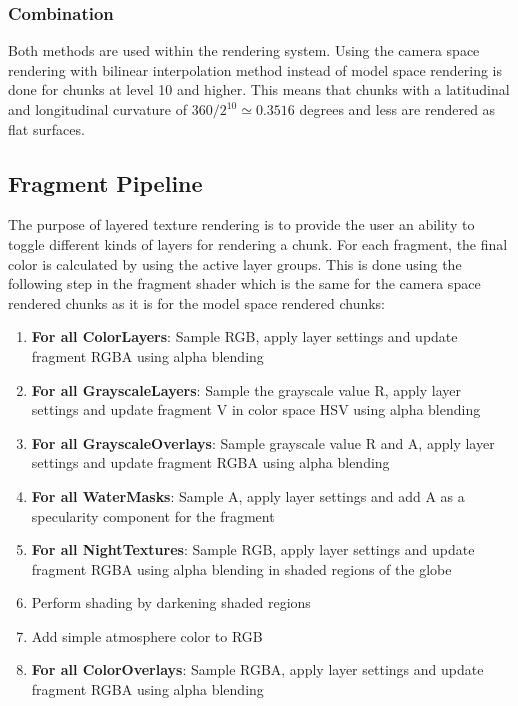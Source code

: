 \subsubsection{Combination}
Both methods are used within the rendering system. Using the camera space rendering with bilinear interpolation method instead of model space rendering is done for chunks at level 10 and higher. This means that chunks with a latitudinal and longitudinal curvature of $360 / 2^{10} \simeq 0.3516$ degrees and less are rendered as flat surfaces.


\subsection{Fragment Pipeline}

The purpose of layered texture rendering is to provide the user an ability to toggle different kinds of layers for rendering a chunk. For each fragment, the final color is calculated by using the active layer groups. This is done using the following step in the fragment shader which is the same for the camera space rendered chunks as it is for the model space rendered chunks:


\begin{enumerate}
\item \textbf{For all ColorLayers}: Sample RGB, apply layer settings and update fragment RGBA using alpha blending
\item \textbf{For all GrayscaleLayers}: Sample the grayscale value R, apply layer settings and update fragment V in color space HSV using alpha blending
\item \textbf{For all GrayscaleOverlays}: Sample grayscale value R and A, apply layer settings and update fragment RGBA using alpha blending
\item \textbf{For all WaterMasks}: Sample A, apply layer settings and add A as a specularity component for the fragment
\item \textbf{For all NightTextures}: Sample RGB, apply layer settings and update fragment RGBA using alpha blending in shaded regions of the globe
\item Perform shading by darkening shaded regions
\item Add simple atmosphere color to RGB
\item \textbf{For all ColorOverlays}: Sample RGBA, apply layer settings and update fragment RGBA using alpha blending

\end{enumerate}

